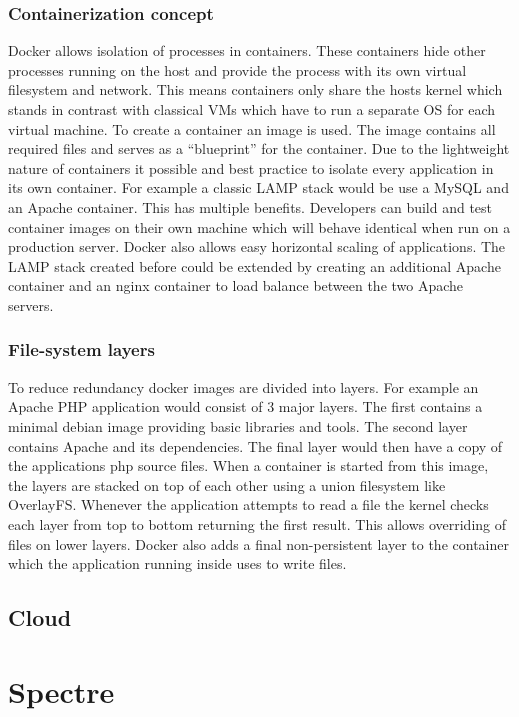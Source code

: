 \documentclass[conference,compsoc,final,a4paper]{IEEEtran}
\begin{document}
\subsubsection*{Containerization concept}
Docker allows isolation of processes in containers. These containers hide other processes running on the host and provide the process with its own virtual filesystem
and network. This means containers only share the hosts kernel which stands in contrast with classical VMs which have to run a separate OS for each virtual
machine. To create a container an image is used. The image contains all required files and serves as a \enquote{blueprint} for the container. Due to the lightweight
nature of containers it possible and best practice to isolate every application in its own container. For example a classic LAMP stack would be use a MySQL
and an Apache container. This has multiple benefits. Developers can build and test container images on their own machine which will behave
identical when run on a production server. Docker also allows easy horizontal scaling of applications. The LAMP stack created before could be extended by
creating an additional Apache container and an nginx container to load balance between the two Apache servers.
\subsubsection*{File-system layers}
To reduce redundancy docker images are divided into layers. For example an Apache PHP application would consist of 3
major layers. The first contains a minimal debian image providing basic libraries and tools. The second layer contains Apache and its dependencies. The final
layer would then have a copy of the applications php source files. When a container is started from this image, the layers are stacked on top of each other
using a union filesystem like OverlayFS\cite{overlayfs}. Whenever the application attempts to read a file the kernel checks each layer from top to bottom
returning the first result. This allows overriding of files on lower layers. Docker also adds a final non-persistent layer to the container which the application
running inside uses to write files.
\subsection{Cloud}

\section{Spectre}
\end{document}
